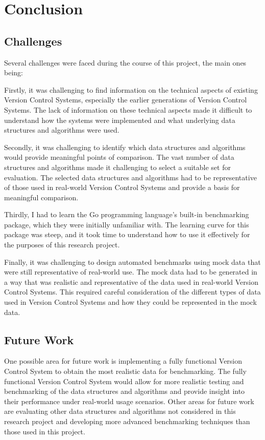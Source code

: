 \chapter{Conclusion} %
\label{chap:conclusion}

\section{Challenges}
\noindent
Several challenges were faced during the course of this project, the main ones being:

Firstly, it was challenging to find information on the technical aspects of existing Version Control Systems, especially the earlier generations of Version Control Systems. The lack of information on these technical aspects made it difficult to understand how the systems were implemented and what underlying data structures and algorithms were used.
\smallskip

Secondly, it was challenging to identify which data structures and algorithms would provide meaningful points of comparison. The vast number of data structures and algorithms made it challenging to select a suitable set for evaluation. The selected data structures and algorithms had to be representative of those used in real-world Version Control Systems and provide a basis for meaningful comparison.
\smallskip

Thirdly, I had to learn the Go programming language's built-in benchmarking package, which they were initially unfamiliar with. The learning curve for this package was steep, and it took time to understand how to use it effectively for the purposes of this research project.
\smallskip

Finally, it was challenging to design automated benchmarks using mock data that were still representative of real-world use. The mock data had to be generated in a way that was realistic and representative of the data used in real-world Version Control Systems. This required careful consideration of the different types of data used in Version Control Systems and how they could be represented in the mock data.

\section{Future Work}
\noindent
One possible area for future work is implementing a fully functional Version Control System to obtain the most realistic data for benchmarking. The fully functional Version Control System would allow for more realistic testing and benchmarking of the data structures and algorithms and provide insight into their performance under real-world usage scenarios.
Other areas for future work are evaluating other data structures and algorithms not considered in this research project and developing more advanced benchmarking techniques than those used in this project.